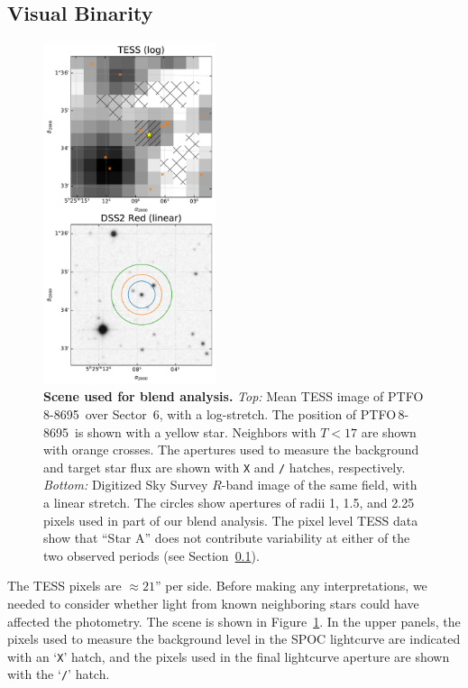\documentclass[12pt,twocolumn,tighten]{aastex62}
\newcommand{\ptfo}{PTFO$\,$8-8695}
\begin{document}
\subsection{Visual Binarity}
\label{subsec:blend}

\begin{figure}[t]
	\begin{center}
		\leavevmode
		\includegraphics[width=0.45\textwidth]{f4.pdf}
	\end{center}
	\vspace{-0.7cm}
	\caption{ {\bf Scene used for blend analysis.}
		{\it Top:} Mean TESS image of \ptfo\ over Sector~6, with a
		log-stretch.  The position of \ptfo\ is shown with a yellow
		star.  Neighbors with $T<17$ are shown with orange crosses.  The
		apertures used to measure the background and target star flux are
		shown with \texttt{X} and \texttt{/} hatches, respectively.
		{\it Bottom:} Digitized Sky Survey $R$-band image of the same
		field, with a linear stretch. The circles show apertures of radii
		1, 1.5, and 2.25 pixels used in part of our blend analysis.  The
		pixel level TESS data show that ``Star A''  does not contribute
		variability at either of the two observed periods (see
		Section~\ref{subsec:blend}).
		\label{fig:scene}
	}
\end{figure}


The TESS pixels are $\approx21$'' per side. Before making any
interpretations, we needed to consider whether light from known
neighboring stars could have affected the photometry.  The scene is
shown in Figure~\ref{fig:scene}.  In the upper panels, the pixels used
to measure the background level in the SPOC lightcurve are indicated
with an `\texttt{X}' hatch, and the pixels used in the final
lightcurve aperture are shown with the `\texttt{/}' hatch.
\end{document}
